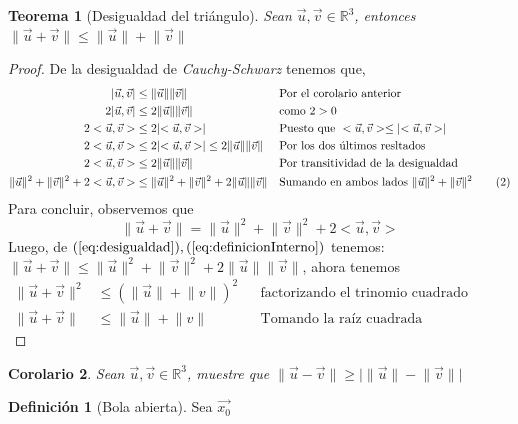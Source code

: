 \documentclass[letterpaper]{article}
\providecommand{\abs}[1]{\lvert#1\rvert}
\providecommand{\norm}[1]{\lVert#1\rVert}
\providecommand{\pint}[1]{<#1>}
\newcommand{\R}{\mathds{R}}
\renewcommand{\u}{\vec{u}}
\renewcommand{\v}{\vec{v}}
\renewcommand{\*}{\cdot}
\newtheorem{theorem}{Teorema}[section]
\newtheorem{corolario}[theorem]{Corolario}
\theoremstyle{definition}
\newtheorem{definition}{Definición}
\begin{document}
\newpage
\begin{theorem}[Desigualdad del triángulo]
	Sean $ \u, \v  \in \R^3$, entonces $ \norm{\u + \v} \leq \norm{\u} + \norm{\v} $
\end{theorem}
\begin{proof}
	De la desigualdad de \textit{ Cauchy-Schwarz} tenemos que, 
	\begin{align*}
		\abs{\u, \v} &\leq \norm{\u} \norm{\v} && \text{Por el corolario anterior}\\
		2\abs{\u, \v} &\leq 2\norm{\u} \norm{\v} && \text{como $ 2> 0 $}\\
		2\pint{\u, \v} &\leq 2 \abs{\pint{\u, \v}} && \text{Puesto que } \pint{\u, \v} \leq \abs{\pint{\u, \v}}\\
		2\pint{\u, \v} &\leq 2 \abs{\pint{\u, \v}} \leq  2\norm{\u}\norm{\v}  && \text{Por los dos últimos resltados}\\
		2\pint{\u, \v} &\leq  2\norm{\u}\norm{\v}  && \text{Por transitividad de la desigualdad }\\
		\norm{\u}^2 + \norm{\v}^2 + 2\pint{\u, \v} &\leq \norm{\u}^2 + \norm{\v}^2 + 2\norm{\u}\norm{\v}  && \text{Sumando en ambos lados } \norm{\u}^2 + \norm{\v}^2 \label{eq:desigualdad} \tag{2}\\
	\end{align*}
	Para concluir, observemos que $$ \norm{\u + \v} = \norm{\u}^2 + \norm{\v}^2 + 2 \pint{\u, \v} \label{eq:definicionInterno} \label{3} $$
	Luego, de $ (\ref{eq:desigualdad}), (\ref{eq:definicionInterno}) $ tenemos: 
	$ \norm{\u + \v} \leq \norm{\u}^2 + \norm{\v}^2 + 2 \norm{\u} \norm{\v} $, ahora tenemos 
	\begin{align*}
	\norm{\u+ \v}^2 & \leq (\norm{\u} + \norm{v})^2 && \text{factorizando el trinomio cuadrado pefecto}\\
	\norm{\u+ \v} & \leq \norm{\u} + \norm{v} && \text{Tomando la raíz cuadrada}
	\end{align*}
\end{proof}
\begin{corolario}
	Sean $ \u, \v \in \R^3 $, muestre que $ \norm{\u - \v} \geq \abs{\norm{\u} - \norm{\v}} $
\end{corolario}
\begin{definition}[Bola abierta]
	Sea $ \vec{x_0} $
\end{definition}
\end{document}
